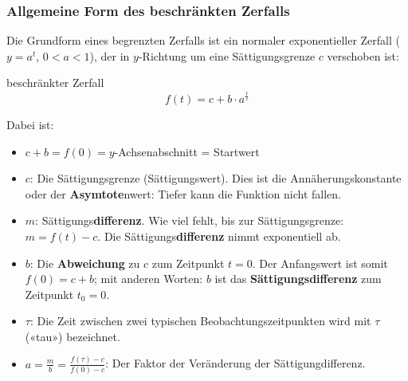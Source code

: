 \subsubsection{Allgemeine Form des beschränkten Zerfalls}
\begin{center}
\end{center}

Die Grundform eines begrenzten Zerfalls ist ein normaler
exponentieller Zerfall ($y=a^{t}$, $0<a<1$), der in $y$-Richtung um eine Sättigungsgrenze $c$ verschoben ist:

\begin{definition}{beschränkter Zerfall}{}
$$f(t) = c + b\cdot{}a^{\frac{t}{\tau}}$$
\end{definition}

Dabei ist:
\begin{itemize}
  \item $c+b = f(0) = y$-Achsenabschnitt = Startwert
	\item $c$: Die Sättigungsgrenze (Sättigungswert). Dies ist die Annäherungskonstante oder der \textbf{Asymtote}nwert: Tiefer kann die Funktion nicht fallen.

	\item $m$:
    Sättigungs\textbf{differenz}. Wie viel fehlt, bis zur
    Sättigungsgrenze: $m = f(t) - c$. Die Sättigungs\textbf{differenz} nimmt exponentiell ab.
	\item $b$: Die \textbf{Abweichung} zu $c$ zum Zeitpunkt $t=0$. Der
    Anfangswert ist somit $f(0) = c + b$; mit anderen Worten: $b$ ist das
    \textbf{Sättigungsdifferenz} zum Zeitpunkt $t_0 = 0$.
	\item $\tau$: Die Zeit zwischen zwei typischen Beobachtungszeitpunkten wird
    mit $\tau$ («tau») bezeichnet.
    \item $a=\frac{m}{b}=\frac{f(\tau)-c}{f(0)-c}$: Der Faktor der Veränderung der
      Sättigungdifferenz.
\end{itemize}

